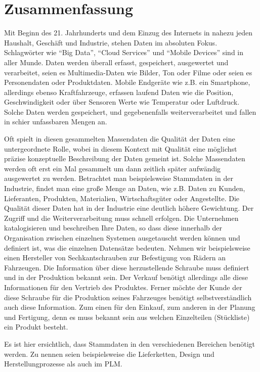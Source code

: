 \chapter*{Zusammenfassung}


Mit Beginn des 21. Jahrhunderts und dem Einzug des Internets in nahezu jeden Haushalt, Geschäft und Industrie, stehen Daten im absoluten Fokus. Schlagwörter wie \enquote{Big Data}, \enquote{Cloud Services} und \enquote{Mobile Devices} sind in aller Munde. Daten werden überall erfasst, gespeichert, ausgewertet und verarbeitet, seien es Multimedia-Daten wie Bilder, Ton oder Filme oder seien es Personendaten oder Produktdaten. Mobile Endgeräte wie z.B. ein Smartphone, allerdings ebenso Kraftfahrzeuge, erfassen laufend Daten wie die Position, Geschwindigkeit oder über Sensoren Werte wie Temperatur oder Luftdruck. Solche Daten werden gespeichert, und gegebenenfalls weiterverarbeitet und fallen in schier unfassbaren Mengen an. 

Oft spielt in diesen gesammelten Massendaten die Qualität der Daten eine untergeordnete Rolle, wobei in diesem Kontext mit Qualität eine möglichst präzise konzeptuelle Beschreibung der Daten gemeint ist. Solche Massendaten werden oft erst ein Mal gesammelt um dann zeitlich später aufwändig ausgewertet zu werden.
Betrachtet man beispielsweise Stammdaten in der Industrie, findet man eine große Menge an Daten, wie z.B. Daten zu Kunden, Lieferanten, Produkten, Materialien, Wirtschaftsgüter oder Angestellte. Die Qualität dieser Daten hat in der Industrie eine deutlich höhere Gewichtung. Der Zugriff und die Weiterverarbeitung muss schnell erfolgen. Die Unternehmen katalogisieren und beschreiben Ihre Daten, so dass diese innerhalb der Organisation zwischen einzelnen Systemen ausgetauscht werden können und definiert ist, was die einzelnen Datensätze bedeuten. Nehmen wir beispielsweise einen Hersteller von Sechkantschrauben zur Befestigung von Rädern an Fahrzeugen. Die Information über diese herzustellende Schraube muss definiert und in der Produktion bekannt sein. Der Verkauf benötigt allerdings alle diese Informationen für den Vertrieb des Produktes. Ferner möchte der Kunde der diese Schraube für die Produktion seines Fahrzeuges benötigt selbstverständlich auch diese Information. Zum einen für den Einkauf, zum anderen in der Planung und Fertigung, denn es muss bekannt sein aus welchen Einzelteilen (Stückliste) ein Produkt besteht. 

Es ist hier ersichtlich, dass Stammdaten in den verschiedenen Bereichen benötigt werden. Zu nennen seien beispielsweise die Lieferketten, Design und Herstellungprozesse als auch im \gls{PLM}.     

